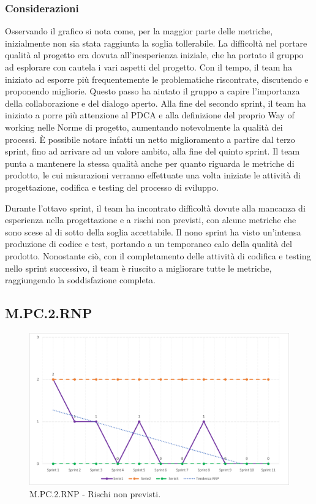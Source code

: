 \documentclass[10pt, a4paper]{article}
\begin{document}
\subsubsection{Considerazioni}
Osservando il grafico si nota come, per la maggior parte delle metriche, inizialmente non sia stata raggiunta la soglia tollerabile.
La difficoltà nel portare qualità al progetto era dovuta all’inesperienza iniziale, che ha portato il gruppo ad esplorare con cautela i vari aspetti del progetto.
Con il tempo, il team ha iniziato ad esporre più frequentemente le problematiche riscontrate, discutendo e proponendo migliorie.
Questo passo ha aiutato il gruppo a capire l’importanza della collaborazione e del dialogo aperto.
Alla fine del secondo sprint, il team ha iniziato a porre più attenzione al PDCA e alla definizione del proprio Way of working nelle Norme di progetto, aumentando notevolmente la qualità dei processi.
È possibile notare infatti un netto miglioramento a partire dal terzo sprint, fino ad arrivare ad un valore ambito, alla fine del quinto sprint. 
Il team punta a mantenere la stessa qualità anche per quanto riguarda le metriche di prodotto, le cui misurazioni verranno effettuate una volta iniziate le attività di progettazione, codifica e testing del processo di sviluppo.

Durante l'ottavo sprint, il team ha incontrato difficoltà dovute alla mancanza di esperienza nella progettazione e a rischi non previsti, con alcune metriche che sono scese al di sotto della soglia accettabile. Il nono sprint ha visto un'intensa produzione di codice e test, portando a un temporaneo calo della qualità del prodotto. Nonostante ciò, con il completamento delle attività di codifica e testing nello sprint successivo, il team è riuscito a migliorare tutte le metriche, raggiungendo la soddisfazione completa.


\subsection{M.PC.2.RNP}
\begin{figure}[H]
\includegraphics[width=15.5cm]{img/metriche/MPC2RNP.png}
\caption{M.PC.2.RNP - Rischi non previsti.}
\end{figure}
\end{document}
